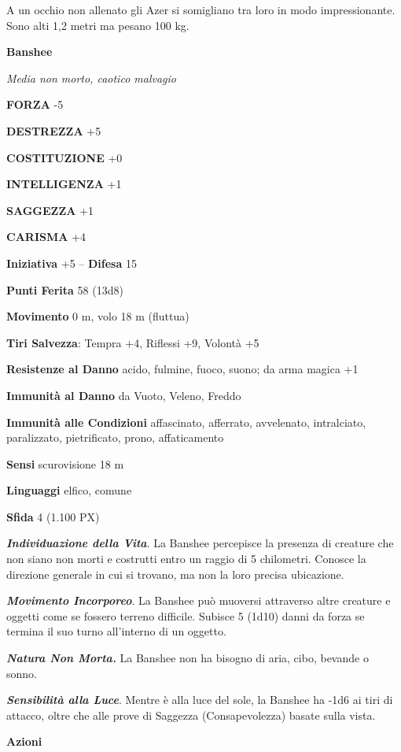\begin{multicols}{2}
A un occhio non allenato gli Azer si somigliano tra loro in modo impressionante. Sono alti 1,2 metri ma pesano 100 kg.

\medskip{}\textbf{Banshee}

\textit{Media non morto, caotico malvagio}

\textbf{FORZA} -5

\textbf{DESTREZZA} +5

\textbf{COSTITUZIONE} +0

\textbf{INTELLIGENZA} +1

\textbf{SAGGEZZA} +1

\textbf{CARISMA} +4

\textbf{Iniziativa} +5 -- \textbf{Difesa} 15

\textbf{Punti Ferita} 58 (13d8)

\textbf{Movimento} 0 m, volo 18 m (fluttua)

\textbf{Tiri Salvezza}: Tempra +4, Riflessi +9, Volontà +5

\textbf{Resistenze al Danno} acido, fulmine, fuoco, suono; da arma magica +1

\textbf{Immunità al Danno} da Vuoto, Veleno, Freddo

\textbf{Immunità alle Condizioni} affascinato, afferrato, avvelenato, intralciato, paralizzato, pietrificato, prono, affaticamento

\textbf{Sensi} scurovisione 18 m

\textbf{Linguaggi} elfico, comune

\textbf{Sfida} 4 (1.100 PX)

\textit{\textbf{Individuazione della Vita}}. La Banshee percepisce la presenza di creature che non siano non morti e costrutti entro un raggio di 5 chilometri. Conosce la direzione generale in cui si trovano, ma non la loro precisa ubicazione.

\textit{\textbf{Movimento Incorporeo}}. La Banshee può muoversi attraverso altre creature e oggetti come se fossero terreno difficile. Subisce 5 (1d10) danni da forza se termina il suo turno all'interno di un oggetto.

\textit{\textbf{Natura Non Morta.}} La Banshee non ha bisogno di aria, cibo, bevande o sonno.

\textit{\textbf{Sensibilità alla Luce}}. Mentre è alla luce del sole, la Banshee ha -1d6 ai tiri di attacco, oltre che alle prove di Saggezza (Consapevolezza) basate sulla vista.

\textbf{Azioni}


\end{multicols}
